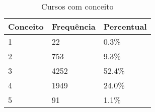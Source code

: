\begin{table}[H]
\centering
\begin{tabular}{@{}lll@{}}
\toprule
\textbf{Conceito} & \textbf{Frequência} & \textbf{Percentual} \\ \midrule
1                 & 22                  & 0.3\%               \\
2                 & 753                 & 9.3\%               \\
3                 & 4252                & 52.4\%              \\
4                 & 1949                & 24.0\%              \\
5                 & 91                  & 1.1\%               \\ \bottomrule
\end{tabular}
\caption{Cursos com conceito}
\label{tbl: cursos-com-conceito}
\end{table}